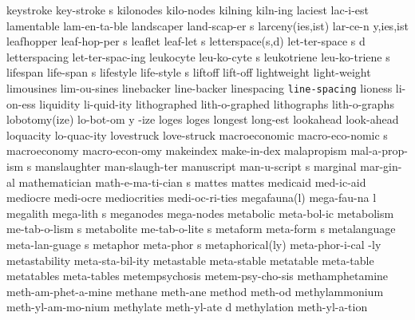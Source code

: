 \5 keystroke		key-stroke s
\NewWordtrue
\1 kilonodes		kilo-nodes		%
\1 kilning		kiln-ing
\1 laciest		lac-i-est
\1 lamentable		lam-en-ta-ble
\5 landscaper		land-scap-er s
\2 larceny(ies,ist) 	lar-ce-n y,ies,ist
\5 leafhopper		leaf-hop-per s	%
\5 leaflet		leaf-let s		%
\3 letterspace(s,d)	let-ter-space s d	%
\1 letterspacing	let-ter-spac-ing
\5 leukocyte	 	leu-ko-cyte s 		%
\NewWordtrue
\5 leukotriene		leu-ko-triene s		%
\5 lifespan		life-span s
\5 lifestyle		life-style s            %
\1 liftoff		lift-off		%
\1 lightweight		light-weight
\1 limousines		lim-ou-sines
\1 linebacker		line-backer
\1 linespacing		{\tt\bs line-spacing}
\1 lioness		li-on-ess		%
\1 liquidity		li-quid-ity		%
\1 lithographed		lith-o-graphed
\1 lithographs		lith-o-graphs
\3 lobotomy(ize)	lo-bot-om y -ize
\1 loges		loges
\1 longest		long-est
\1 lookahead		look-ahead		%
\1 loquacity		lo-quac-ity          %
\1 lovestruck           love-struck		%
\5 macroeconomic	macro-eco-nomic s
\1 macroeconomy		macro-econ-omy		%
\1 makeindex		make-in-dex		%
\5 malapropism		mal-a-prop-ism s
\1 manslaughter		man-slaugh-ter		%
\5 manuscript		man-u-script s
\1 marginal		mar-gin-al
\5 mathematician	math-e-ma-ti-cian s
\1 mattes		mattes
\1 medicaid		med-ic-aid
\1 mediocre		medi-ocre
\1 mediocrities		medi-oc-ri-ties
\2 megafauna(l)		mega-fau-na l		%
\5 megalith		mega-lith s
\NewWordtrue
\1 meganodes		mega-nodes		%
\1 metabolic		meta-bol-ic
\5 metabolism		me-tab-o-lism s
\5 metabolite		me-tab-o-lite s
\5 metaform		meta-form s		%
\5 metalanguage		meta-lan-guage s
\5 metaphor		meta-phor s		%
\2 metaphorical(ly)	meta-phor-i-cal -ly	%
\1 metastability	meta-sta-bil-ity	%
\1 metastable		meta-stable		%
\1 metatable		meta-table		%
\1 metatables		meta-tables		%
\1 metempsychosis	metem-psy-cho-sis	%
\1 methamphetamine	meth-am-phet-a-mine	%
\1 methane		meth-ane		%
\1 method		meth-od			%
\1 methylammonium	meth-yl-am-mo-nium	%
\5 methylate		meth-yl-ate d		%
\1 methylation		meth-yl-a-tion		%
